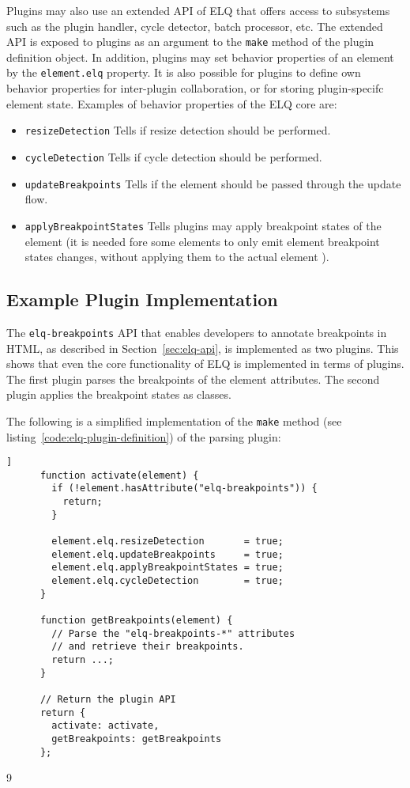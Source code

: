 \documentclass{acm_proc_article-sp}
\newcommand{\code}[1]{\texttt{#1}}
\newcommand{\elq}{ELQ}
\begin{document}
  Plugins may also use an extended API of \elq{} that offers access to subsystems such as the plugin handler, cycle detector, batch processor, etc.
  The extended API is exposed to plugins as an argument to the \code{make} method of the plugin definition object.
  In addition, plugins may set behavior properties of an element by the \code{element.elq} property.
  It is also possible for plugins to define own behavior properties for inter-plugin collaboration, or for storing plugin-specifc element state.
  Examples of behavior properties of the \elq{} core are:
  \begin{itemize}
    \item \code{resizeDetection} Tells if resize detection should be performed.
    \item \code{cycleDetection} Tells if cycle detection should be performed.
    \item \code{updateBreakpoints} Tells if the element should be passed through the update flow.
    \item \code{applyBreakpointStates} Tells plugins may apply breakpoint states of the element (it is needed fore some elements to only emit element breakpoint states changes, without applying them to the actual element \cite{elq-thesis}).
  \end{itemize}

  \subsection{Example Plugin Implementation}
    The \code{elq-breakpoints} API that enables developers to annotate breakpoints in HTML, as described in Section~\ref{sec:elq-api}, is implemented as two plugins.
    This shows that even the core functionality of \elq{} is implemented in terms of plugins.
    The first plugin parses the breakpoints of the element attributes.
    The second plugin applies the breakpoint states as classes.

    The following is a simplified implementation of the \code{make} method (see listing~\ref{code:elq-plugin-definition}) of the parsing plugin:

    \begin{lstlisting}[gobble=6,caption={},captionpos=b,label={}]]
      function activate(element) {
        if (!element.hasAttribute("elq-breakpoints")) {
          return;
        }

        element.elq.resizeDetection       = true;
        element.elq.updateBreakpoints     = true;
        element.elq.applyBreakpointStates = true;
        element.elq.cycleDetection        = true;
      }

      function getBreakpoints(element) {
        // Parse the "elq-breakpoints-*" attributes
        // and retrieve their breakpoints.
        return ...;
      }

      // Return the plugin API
      return {
        activate: activate,
        getBreakpoints: getBreakpoints
      };
    \end{lstlisting}9
\end{document}
